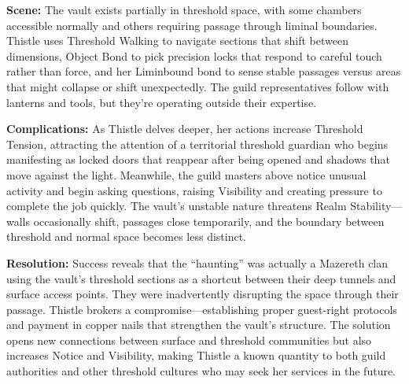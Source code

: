 \documentclass[11pt,letterpaper]{article}
\begin{document}
\textbf{Scene:} The vault exists partially in threshold space, with some chambers accessible normally and others requiring passage through liminal boundaries. Thistle uses Threshold Walking to navigate sections that shift between dimensions, Object Bond to pick precision locks that respond to careful touch rather than force, and her Liminbound bond to sense stable passages versus areas that might collapse or shift unexpectedly. The guild representatives follow with lanterns and tools, but they're operating outside their expertise.

\textbf{Complications:} As Thistle delves deeper, her actions increase Threshold Tension, attracting the attention of a territorial threshold guardian who begins manifesting as locked doors that reappear after being opened and shadows that move against the light. Meanwhile, the guild masters above notice unusual activity and begin asking questions, raising Visibility and creating pressure to complete the job quickly. The vault's unstable nature threatens Realm Stability---walls occasionally shift, passages close temporarily, and the boundary between threshold and normal space becomes less distinct.

\textbf{Resolution:} Success reveals that the ``haunting'' was actually a Mazereth clan using the vault's threshold sections as a shortcut between their deep tunnels and surface access points. They were inadvertently disrupting the space through their passage. Thistle brokers a compromise---establishing proper guest-right protocols and payment in copper nails that strengthen the vault's structure. The solution opens new connections between surface and threshold communities but also increases Notice and Visibility, making Thistle a known quantity to both guild authorities and other threshold cultures who may seek her services in the future.
\end{document}
